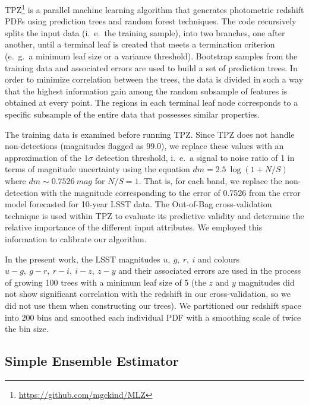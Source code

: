 \textsc{TPZ}\footnote{\url{https://github.com/mgckind/MLZ}} \citep[Trees for Photo-$z$,][]{Carrasco_Kind:13,Carrascokind:14} is a parallel machine learning algorithm that generates photometric redshift PDFs using prediction trees and random forest techniques.
The code recursively splits the input data (i.~e.~the training sample), into two branches, one after another, until a terminal leaf is created that meets a termination criterion (e.~g.~a minimum leaf size or a variance threshold).
Bootstrap samples from the training data and associated errors are used to build a set of prediction trees.
In order to minimize correlation between the trees, the data is divided in such a way that the highest information gain among the random subsample of features is obtained at every point.
The regions in each terminal leaf node corresponds to a specific subsample of the entire data that possesses similar properties.

The training data is examined before running TPZ.
Since TPZ does not handle non-detections (magnitudes flagged as 99.0), we replace these values with an approximation of the $1\sigma$ detection threshold, i.~e.~a signal to noise ratio of 1 in terms of magnitude uncertainty using the equation $dm = 2.5 ~ \log ( 1 + N/S )$ where $dm \sim 0.7526 ~ mag$ for $N/S=1$.
That is, for each band, we replace the non-detection with the magnitude corresponding to the error of 0.7526 from the error model forecasted for 10-year LSST data.
The Out-of-Bag \citep{Breiman:84,Carrasco_Kind:13} cross-validation technique is used within TPZ to evaluate its predictive validity and determine the relative importance of the different input attributes.
We employed this information to calibrate our algorithm.

In the present work, the LSST magnitudes $u,~g,~r,~i$ and colours $u-g,~g-r,~r-i,~i-z,~z-y$ and their associated errors are used in the process of growing 100 trees with a minimum leaf size of 5 (the $z$ and $y$ magnitudes did not show significant correlation with the redshift in our cross-validation, so we did not use them when constructing our trees).
We partitioned our redshift space into 200 bins and smoothed each individual PDF with a smoothing scale of twice the bin size.

\subsection{Simple Ensemble Estimator}
\label{sec:method:trainz}

